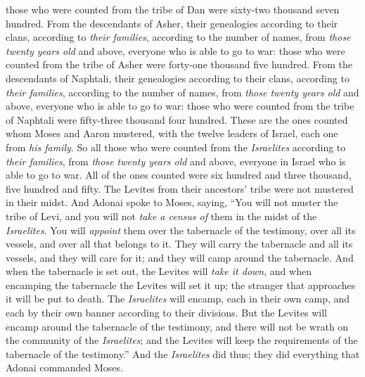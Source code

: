 \begin{biblechapter}
\verse those who were counted from the tribe of Dan were sixty-two thousand seven hundred.
\verse From the descendants of Asher, their genealogies according to their clans, according to \textit{their families}, according to the number of names, from \textit{those twenty years old} and above, everyone who is able to go to war:
\verse those who were counted from the tribe of Asher were forty-one thousand five hundred.
\verse From the descendants of Naphtali, their genealogies according to their clans, according to \textit{their families}, according to the number of names, from \textit{those twenty years old} and above, everyone who is able to go to war:
\verse those who were counted from the tribe of Naphtali were fifty-three thousand four hundred.
\verse These are the ones counted whom Moses and Aaron mustered, with the twelve leaders of Israel, each one from \textit{his family}.
\verse So all those who were counted from the \textit{Israelites} according to \textit{their families}, from \textit{those twenty years old} and above, everyone in Israel who is able to go to war.
\verse All of the ones counted were six hundred and three thousand, five hundred and fifty.
\verse The Levites from their ancestors’ tribe were not mustered in their midst.
\verse And Adonai spoke to Moses, saying,
\verse “You will not muster the tribe of Levi, and you will not \textit{take a census of} them in the midst of the \textit{Israelites}.
\verse You will \textit{appoint} them over the tabernacle of the testimony, over all its vessels, and over all that belongs to it. They will carry the tabernacle and all its vessels, and they will care for it; and they will camp around the tabernacle.
\verse And when the tabernacle is set out, the Levites will \textit{take it down}, and when encamping the tabernacle the Levites will set it up; the stranger that approaches it will be put to death.
\verse The \textit{Israelites} will encamp, each in their own camp, and each by their own banner according to their divisions.
\verse But the Levites will encamp around the tabernacle of the testimony, and there will not be wrath on the community of the \textit{Israelites}; and the Levites will keep the requirements of the tabernacle of the testimony.”
\verse And the \textit{Israelites} did thus; they did everything that Adonai commanded Moses.
\end{biblechapter}

